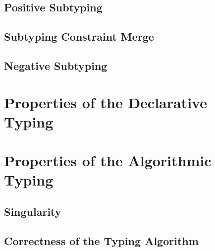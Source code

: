 \documentclass[a4,natbib=false]{article}
\newcommand{\genDir}{_gen}
\begin{document}
\subsection{Positive Subtyping}


\subsection{Subtyping Constraint Merge}


\subsection{Negative Subtyping}





\section{Properties of the Declarative Typing}





\section{Properties of the Algorithmic Typing}

\subsection{Singularity}


\subsection{Correctness of the Typing Algorithm}


\printbibliography
\end{document}
